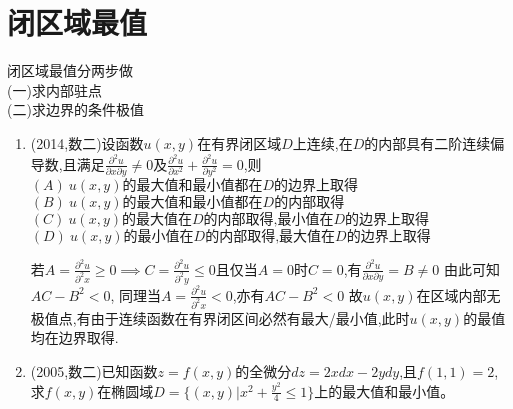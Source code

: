 \documentclass[12pt, a4paper, oneside, UTF8]{ctexbook}
\begin{document}
\section{闭区域最值}
\begin{remark}
    闭区域最值分两步做 \\
    (一)求内部驻点 \\
    (二)求边界的条件极值
\end{remark}
\begin{enumerate}[label=\arabic*.,start=12]
    \item (2014,数二)设函数$u(x,y)$在有界闭区域$D$上连续,在$D$的内部具有二阶连续偏导数,且满足$\frac{\partial^2 u}{\partial x\partial y}\neq 0$及$\frac{\partial^2 u}{\partial x^2}+\frac{\partial^2 u}{\partial y^2}=0$,则 \\
    $(A)\ u(x,y)\text{的最大值和最小值都在}D\text{的边界上取得}$ \\
    $(B)\ u(x,y)\text{的最大值和最小值都在}D\text{的内部取得}$ \\
    $(C)\ u(x,y)\text{的最大值在}D\text{的内部取得,最小值在}D\text{的边界上取得}$ \\
    $(D)\ u(x,y)\text{的最小值在}D\text{的内部取得,最大值在}D\text{的边界上取得}$

    
    \begin{solution}
    $\text{若} A = \frac{\partial^2 u}{\partial^2 x} \geq 0 \implies C=\frac{\partial^2 u}{\partial^2 y} \leq 0$且仅当$A=0$时$C=0$,有$\frac{\partial^2 u}{\partial x\partial y}=B\neq 0$
    由此可知$AC-B^2 < 0$, 同理当$A = \frac{\partial^2 u}{\partial^2 x} < 0$,亦有$AC-B^2 < 0$ 故$u(x,y)$在区域内部无极值点,有由于连续函数在有界闭区间必然有最大/最小值,此时$u(x,y)$的最值均在边界取得.
    \end{solution}
    
    \item (2005,数二)已知函数$z=f(x,y)$的全微分$dz=2xdx-2ydy$,且$f(1,1)=2$,求$f(x,y)$在椭圆域$D=\{(x,y)|x^2+\frac{y^2}{4}\leq 1\}$上的最大值和最小值。
    

\end{enumerate}
\end{document}
